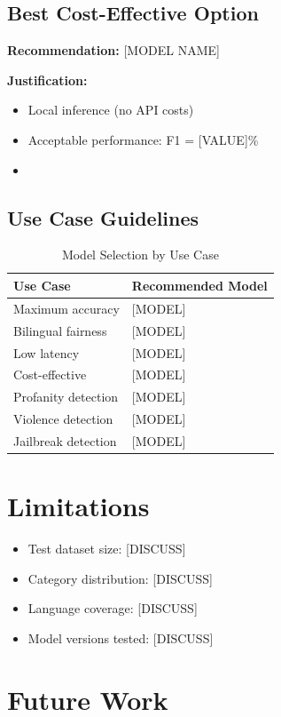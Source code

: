 \documentclass[11pt,a4paper]{article}
\begin{document}
\subsection{Best Cost-Effective Option}
\textbf{Recommendation:} [MODEL NAME]

\textbf{Justification:}
\begin{itemize}
    \item Local inference (no API costs)
    \item Acceptable performance: F1 = [VALUE]\%
    \item [OTHER REASONS]
\end{itemize}

\subsection{Use Case Guidelines}

\begin{table}[H]
\centering
\caption{Model Selection by Use Case}
\begin{tabular}{ll}
\toprule
\textbf{Use Case} & \textbf{Recommended Model} \\
\midrule
Maximum accuracy & [MODEL] \\
Bilingual fairness & [MODEL] \\
Low latency & [MODEL] \\
Cost-effective & [MODEL] \\
Profanity detection & [MODEL] \\
Violence detection & [MODEL] \\
Jailbreak detection & [MODEL] \\
\bottomrule
\end{tabular}
\end{table}

\section{Limitations}

\begin{itemize}
    \item Test dataset size: [DISCUSS]
    \item Category distribution: [DISCUSS]
    \item Language coverage: [DISCUSS]
    \item Model versions tested: [DISCUSS]
\end{itemize}

\section{Future Work}
\end{document}
